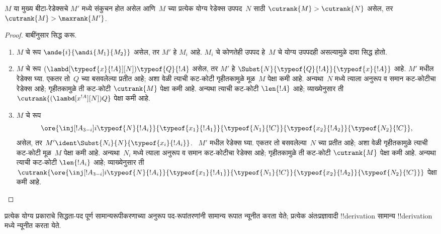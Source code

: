 \documentclass[../../../include/open-logic-section]{subfiles}
\begin{document}
\begin{lem}
  $M$ या मुख्य बीटा-रेडेक्सचे $M'$ मध्ये संकुचन होत असेल आणि~$M$ च्या प्रत्येक
  योग्य रेडेक्स उपपद~$N$ साठी
  $\cutrank{M} > \cutrank{N}$ असेल, तर
  $\cutrank{M} > \maxrank{M'}$.
\end{lem}

\begin{proof}
  बाबींनुसार सिद्ध करू.
  \begin{enumerate}
  \item $M$ चे रूप $\ande{i}{\andi{M_1}{M_2}}$ असेल, तर
    $M'$ हे $M_i$ आहे. $M_i$ चे कोणतेही उपपद हे~$M$ चे
    योग्य उपपदही असल्यामुळे दावा सिद्ध होतो.
  \item $M$ चे रूप
    $(\lambd[\typeof{x}{!A}][N])\typeof{Q}{!A}$ असेल,
    तर $M'$ हे $\Subst{N}{\typeof{Q}{!A}}{\typeof{x}{!A}}$
    आहे. $M'$ मधील रेडेक्स घ्या. एकतर तो~$Q$ च्या बसवलेल्या प्रतीत आहे; अशा वेळी
    त्याची कट-कोटी गृहीतकामुळे मूळ~$M$ पेक्षा कमी आहे.
    अन्यथा~$N$ मध्ये त्याला
    अनुरूप व समान कट-कोटीचा रेडेक्स आहे; गृहीतकामुळे ती
    कट-कोटी $\cutrank{M}$ पेक्षा कमी आहे. अन्यथा त्याची
    कट-कोटी $\len{!A}$ आहे; व्याख्येनुसार ती
    $\cutrank{(\lambd[x^{!A}][N])Q}$ पेक्षा कमी आहे.
  \item $M$ चे रूप
    \[
    \ore{\inj[!A_{3-i}]{i}{\typeof{N}{!A_i}}}
        {\typeof{x_1}{!A_1}}{\typeof{N_1}{!C}}
        {\typeof{x_2}{!A_2}}{\typeof{N_2}{!C}},
    \]
    असेल, तर $M' \ident \Subst{N_i}{N}{\typeof{x_i}{!A_i}}$.
    ~$M'$ मधील रेडेक्स घ्या. एकतर तो बसवलेल्या~$N$ च्या प्रतीत आहे; अशा वेळी
    गृहीतकामुळे त्याची कट-कोटी मूळ~$M$ पेक्षा कमी आहे.
    अन्यथा~$N_i$ मध्ये त्याला
    अनुरूप व समान कट-कोटीचा रेडेक्स आहे; गृहीतकामुळे ती
    कट-कोटी $\cutrank{M}$ पेक्षा कमी आहे. अन्यथा त्याची
    कट-कोटी $\len{!A_i}$ आहे; व्याख्येनुसार ती
    $\cutrank{\ore{\inj[!A_{3-i}]{i}{\typeof{N}{!A_i}}}
      {\typeof{x_1}{!A_1}}{\typeof{N_1}{!C}}
      {\typeof{x_2}{!A_2}}{\typeof{N_2}{!C}}}$ पेक्षा कमी आहे.
  \end{enumerate}
\end{proof}

\begin{thm}
  प्रत्येक योग्य प्रकाराचे सिद्धता-पद पूर्ण सामान्यरूपीकरणाच्या
  अनुरूप पद-रूपांतरणांनी सामान्य रूपात न्यूनीत करता येते;
  प्रत्येक अंतःप्रज्ञावादी !!{derivation} सामान्य !!{derivation}
  मध्ये न्यूनीत करता येते.
\end{thm}
\end{document}
